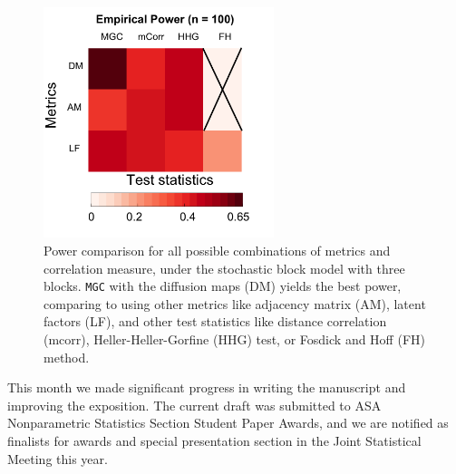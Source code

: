 \documentclass[simplex.tex]{subfiles}
\begin{document}
\begin{figure}[h!]
\begin{cframed}
		\centering
		\includegraphics[width=0.6\textwidth]{../../figs/ThreeSBM.png}
		\caption{Power comparison for all possible combinations of metrics and correlation measure, under the stochastic block model with three blocks. \texttt{MGC} with the diffusion maps (DM) yields the best power, comparing to using other metrics like adjacency matrix (AM), latent factors (LF), and other test statistics like distance correlation (mcorr), Heller-Heller-Gorfine (HHG) test, or Fosdick and Hoff (FH) method.}
		\label{fig:threeSBM}
		\end{cframed}
\end{figure}


This month we made significant progress in writing the manuscript and improving the exposition. The current draft was submitted to ASA Nonparametric Statistics Section Student Paper Awards, and we are notified as finalists for awards and special presentation section in the Joint Statistical Meeting this year. 
\end{document}
